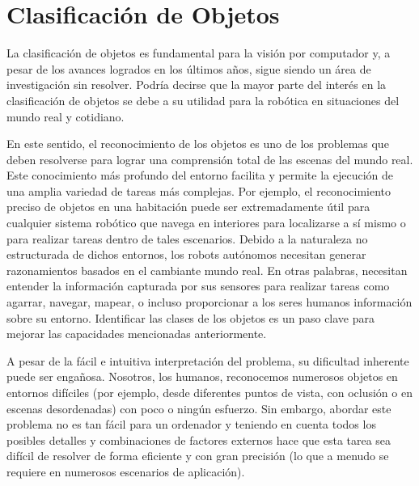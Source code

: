 \chapter{Clasificación de Objetos}

La clasificación de objetos es fundamental para la visión por computador y, a pesar de los avances logrados en los últimos años, sigue siendo un área de investigación sin resolver. Podría decirse que la mayor parte del interés en la clasificación de objetos se debe a su utilidad para la robótica en situaciones del mundo real y cotidiano.

En este sentido, el reconocimiento de los objetos es uno de los problemas que deben resolverse para lograr una comprensión total de las escenas del mundo real. Este conocimiento más profundo del entorno facilita y permite la ejecución de una amplia variedad de tareas más complejas. Por ejemplo, el reconocimiento preciso de objetos en una habitación puede ser extremadamente útil para cualquier sistema robótico que navega en interiores para localizarse a sí mismo o para realizar tareas dentro de tales escenarios. Debido a la naturaleza no estructurada de dichos entornos, los robots autónomos necesitan generar razonamientos basados en el cambiante mundo real. En otras palabras, necesitan entender la información capturada por sus sensores para realizar tareas como agarrar, navegar, mapear, o incluso proporcionar a los seres humanos información sobre su entorno. Identificar las clases de los objetos es un paso clave para mejorar las capacidades mencionadas anteriormente.

A pesar de la fácil e intuitiva interpretación del problema, su dificultad inherente puede ser engañosa. Nosotros, los humanos, reconocemos numerosos objetos en entornos difíciles (por ejemplo, desde diferentes puntos de vista, con oclusión o en escenas desordenadas) con poco o ningún esfuerzo. Sin embargo, abordar este problema no es tan fácil para un ordenador y teniendo en cuenta todos los posibles detalles y combinaciones de factores externos hace que esta tarea sea difícil de resolver de forma eficiente y con gran precisión (lo que a menudo se requiere en numerosos escenarios de aplicación).

